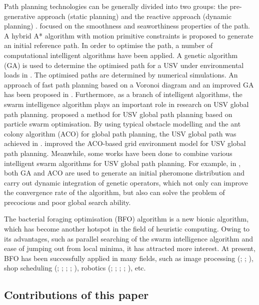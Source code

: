 \documentclass{PDS}%
\theoremstyle{definition}
\begin{document}
Path planning
technologies can be generally divided into two groups: the pre-generative approach
(static planning) and the reactive approach (dynamic planning) \citep{r11}.
\citet{ShiBinghua} focused on the smoothness and seaworthiness properties of the path. A
hybrid A* algorithm with motion primitive constraints is proposed to generate an initial
reference path. In order to optimise the path, a number of computational intelligent
algorithms have been applied. A genetic algorithm (GA) is used to determine the optimised
path for a USV under environmental loads in \citet{r15}. The optimised paths are determined
by numerical simulations. An approach of fast path planning based on a Voronoi diagram
and an improved GA has been proposed in \citet{r16}. Furthermore, as a branch of intelligent
algorithms, the swarm intelligence algorithm plays an important role in research on USV
global path planning. \citet{r17} proposed a method for USV global path planning based on
particle swarm optimisation. By using typical obstacle modelling and the ant colony
algorithm (ACO) for global path planning, the USV global path was achieved in \citet{r18}.
\citet{r19} improved the ACO-based grid environment model for USV global path
planning. Meanwhile, some works have been done to combine various intelligent swarm
algorithms for USV global path planning. For example, in \citet{r20}, both GA and ACO
are used to generate an initial pheromone distribution and carry out dynamic integration of
genetic operators, which not only can improve the convergence rate of the algorithm, but also can
solve the problem of precocious and poor global search ability.

The bacterial foraging optimisation (BFO) algorithm is a new bionic algorithm, which has become another hotspot in the field of heuristic
computing. Owing to its advantages, such as parallel searching of the swarm intelligence algorithm
and ease of jumping out from local minima, it has attracted more interest. At present,
BFO has been successfully applied in many fields, such as image processing
(\citealp{r22}; \citealp{r23}; \citealp{r24}), shop scheduling (\citealp{r25}; \citealp{r28}; \citealp{r27}; \citealp{r26}; \citealp{r29}), robotics (\citealp{r32}; \citealp{r31}; \citealp{r33}; \citealp{r30}; \citealp{r34}), etc.

\subsection{Contributions of this paper}
\end{document}

